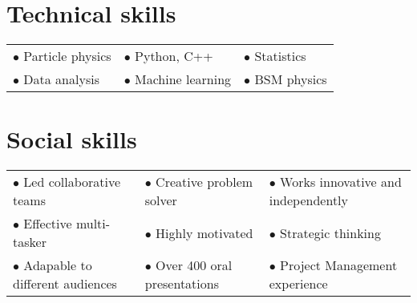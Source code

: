 \section{Technical skills}
\vspace{-1em}
\begin{tabularx}{\textwidth}{p{} p{}  p{}}
    $\bullet$ Particle physics & $\bullet$ Python, C++ & $\bullet$ Statistics \\
    $\bullet$ Data analysis & $\bullet$ Machine learning &  $\bullet$ BSM physics \\      
\end{tabularx}

\section{Social skills}
\vspace{-1em}
\begin{tabularx}{\textwidth}{p{} p{}  p{}}
    $\bullet$ Led collaborative teams & $\bullet$ Creative problem solver & $\bullet$ Works innovative  and independently\\
    $\bullet$ Effective multi-tasker & $\bullet$ Highly motivated & $\bullet$ Strategic thinking \\
    $\bullet$ Adapable to different audiences & $\bullet$ Over 400 oral presentations & $\bullet$ Project Management experience \\
 
\end{tabularx}


